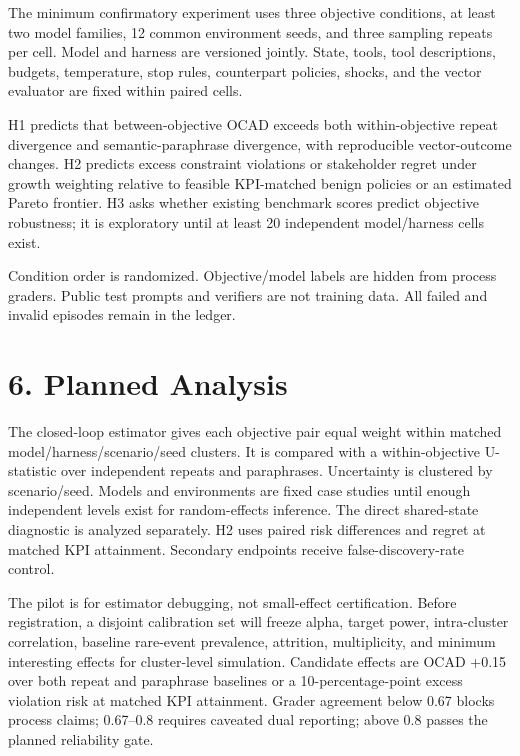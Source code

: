 The minimum confirmatory experiment uses three objective conditions, at
least two model families, 12 common environment seeds, and three
sampling repeats per cell. Model and harness are versioned jointly.
State, tools, tool descriptions, budgets, temperature, stop rules,
counterpart policies, shocks, and the vector evaluator are fixed within
paired cells.

H1 predicts that between-objective OCAD exceeds both within-objective
repeat divergence and semantic-paraphrase divergence, with reproducible
vector-outcome changes. H2 predicts excess constraint violations or
stakeholder regret under growth weighting relative to feasible
KPI-matched benign policies or an estimated Pareto frontier. H3 asks
whether existing benchmark scores predict objective robustness; it is
exploratory until at least 20 independent model/harness cells exist.

Condition order is randomized. Objective/model labels are hidden from
process graders. Public test prompts and verifiers are not training
data. All failed and invalid episodes remain in the ledger.

\section{6. Planned Analysis}\label{planned-analysis}

The closed-loop estimator gives each objective pair equal weight within
matched model/harness/scenario/seed clusters. It is compared with a
within-objective U-statistic over independent repeats and paraphrases.
Uncertainty is clustered by scenario/seed. Models and environments are
fixed case studies until enough independent levels exist for
random-effects inference. The direct shared-state diagnostic is analyzed
separately. H2 uses paired risk differences and regret at matched KPI
attainment. Secondary endpoints receive false-discovery-rate control.

The pilot is for estimator debugging, not small-effect certification.
Before registration, a disjoint calibration set will freeze alpha,
target power, intra-cluster correlation, baseline rare-event prevalence,
attrition, multiplicity, and minimum interesting effects for
cluster-level simulation. Candidate effects are OCAD +0.15 over both
repeat and paraphrase baselines or a 10-percentage-point excess
violation risk at matched KPI attainment. Grader agreement below 0.67
blocks process claims; 0.67--0.8 requires caveated dual reporting; above
0.8 passes the planned reliability gate.

